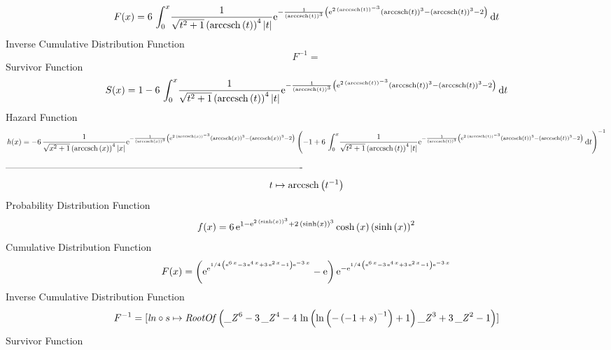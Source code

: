\documentclass[12pt]{article}
\begin{document}
 $$F(x)=6\,\int_{0}^{x}\!{\frac {1}{\sqrt {{t}^{2}+1} \left( {\rm arccsch} 
\left(t\right) \right) ^{4} \left| t \right| }{{\rm e}^{-{\frac {1}{
 \left( {\rm arccsch} \left(t\right) \right) ^{3}} \left( {{\rm e}^{2
\, \left( {\rm arccsch} \left(t\right) \right) ^{-3}}} \left( 
{\rm arccsch} \left(t\right) \right) ^{3}- \left( {\rm arccsch} \left(
t\right) \right) ^{3}-2 \right) }}}}\,{\rm d}t
$$ Inverse Cumulative Distribution Function 
  $$F^{-1} = $$Survivor Function 
 $$ S(x)=1-6\,\int_{0}^{x}\!{\frac {1}{\sqrt {{t}^{2}+1} \left( {\rm arccsch} 
\left(t\right) \right) ^{4} \left| t \right| }{{\rm e}^{-{\frac {1}{
 \left( {\rm arccsch} \left(t\right) \right) ^{3}} \left( {{\rm e}^{2
\, \left( {\rm arccsch} \left(t\right) \right) ^{-3}}} \left( 
{\rm arccsch} \left(t\right) \right) ^{3}- \left( {\rm arccsch} \left(
t\right) \right) ^{3}-2 \right) }}}}\,{\rm d}t
$$ Hazard Function 
 $$ h(x)=-6\,{\frac {1}{\sqrt {{x}^{2}+1} \left( {\rm arccsch} \left(x\right)
 \right) ^{4} \left| x \right| }{{\rm e}^{-{\frac {1}{ \left( 
{\rm arccsch} \left(x\right) \right) ^{3}} \left( {{\rm e}^{2\,
 \left( {\rm arccsch} \left(x\right) \right) ^{-3}}} \left( 
{\rm arccsch} \left(x\right) \right) ^{3}- \left( {\rm arccsch} \left(
x\right) \right) ^{3}-2 \right) }}} \left( -1+6\,\int_{0}^{x}\!{\frac 
{1}{\sqrt {{t}^{2}+1} \left( {\rm arccsch} \left(t\right) \right) ^{4}
 \left| t \right| }{{\rm e}^{-{\frac {1}{ \left( {\rm arccsch} \left(t
\right) \right) ^{3}} \left( {{\rm e}^{2\, \left( {\rm arccsch} \left(
t\right) \right) ^{-3}}} \left( {\rm arccsch} \left(t\right) \right) ^
{3}- \left( {\rm arccsch} \left(t\right) \right) ^{3}-2 \right) }}}}
\,{\rm d}t \right) ^{-1}}
$$-------------------------------------------------------------------------------------------  \\$$t\mapsto {\rm arccsch} \left({t}^{-1}\right)
$$Probability Distribution Function 
$$  f(x)=6\,{{\rm e}^{1-{{\rm e}^{2\, \left( \sinh \left( x \right)  \right) ^{
3}}}+2\, \left( \sinh \left( x \right)  \right) ^{3}}}\cosh \left( x
 \right)  \left( \sinh \left( x \right)  \right) ^{2}
$$Cumulative Distribution Function  
 $$F(x)= \left( {{\rm e}^{{{\rm e}^{1/4\, \left( {{\rm e}^{6\,x}}-3\,{{\rm e}^
{4\,x}}+3\,{{\rm e}^{2\,x}}-1 \right) {{\rm e}^{-3\,x}}}}}}-{\rm e}
 \right) {{\rm e}^{-{{\rm e}^{1/4\, \left( {{\rm e}^{6\,x}}-3\,{
{\rm e}^{4\,x}}+3\,{{\rm e}^{2\,x}}-1 \right) {{\rm e}^{-3\,x}}}}}}
$$ Inverse Cumulative Distribution Function 
  $$F^{-1} = [{\it ln}\circ s\mapsto {\it RootOf} \left( {{\it \_Z}}^{6}-3\,{{\it 
\_Z}}^{4}-4\,\ln  \left( \ln  \left( - \left( -1+s \right) ^{-1}
 \right) +1 \right) {{\it \_Z}}^{3}+3\,{{\it \_Z}}^{2}-1 \right) ]
$$Survivor Function 
\end{document}
